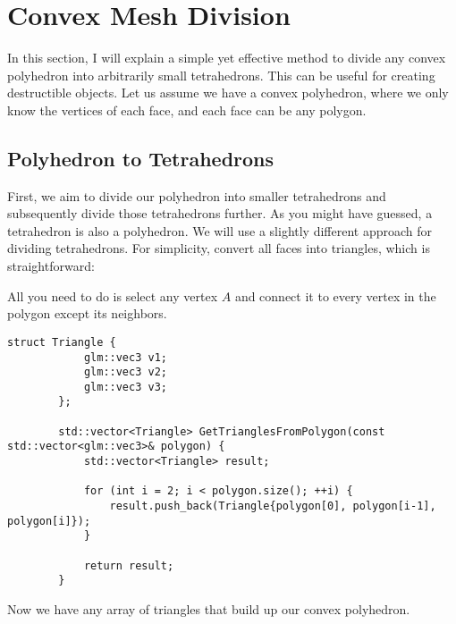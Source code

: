 \documentclass[12pt]{article}
\begin{document}
	
	\section{Convex Mesh Division}
	In this section, I will explain a simple yet effective method to divide any convex polyhedron into arbitrarily small tetrahedrons. This can be useful for creating destructible objects. Let us assume we have a convex polyhedron, where we only know the vertices of each face, and each face can be any polygon.
	
	\subsection{Polyhedron to Tetrahedrons}
	First, we aim to divide our polyhedron into smaller tetrahedrons and subsequently divide those tetrahedrons further. As you might have guessed, a tetrahedron is also a polyhedron. We will use a slightly different approach for dividing tetrahedrons. For simplicity, convert all faces into triangles, which is straightforward:
	
	
	\begin{center}
	\end{center}
	
	All you need to do is select any vertex $A$ and connect it to every vertex in the polygon except its neighbors.
	
	\begin{lstlisting}[style=customcpp]
		struct Triangle {
			glm::vec3 v1;
			glm::vec3 v2;
			glm::vec3 v3;
		};
		
		std::vector<Triangle> GetTrianglesFromPolygon(const std::vector<glm::vec3>& polygon) {
			std::vector<Triangle> result;
			
			for (int i = 2; i < polygon.size(); ++i) {
				result.push_back(Triangle{polygon[0], polygon[i-1], polygon[i]});
			}
			
			return result;
		}	
	\end{lstlisting}
	
	Now we have any array of triangles that build up our convex polyhedron.
	
\end{document}
